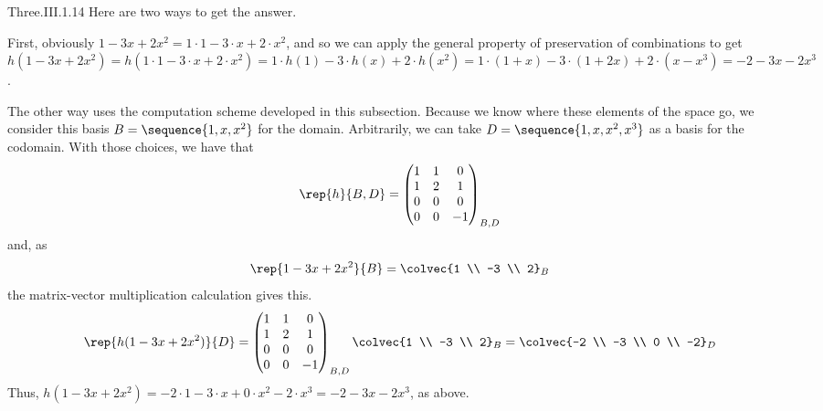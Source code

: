 \begin{ans}{Three.III.1.14}
      Here are two ways to get the answer.

      First, obviously $1-3x+2x^2=1\cdot 1-3\cdot x+2\cdot x^2$, and so we can
      apply the general property of preservation of combinations to get
      $h(1-3x+2x^2)
       =h(1\cdot 1-3\cdot x+2\cdot x^2)
       =1\cdot h(1)-3\cdot h(x)+2\cdot h(x^2)
       =1\cdot (1+x)-3\cdot (1+2x)+2\cdot (x-x^3)
       =-2-3x-2x^3$.

      The other way uses the computation scheme developed in this subsection.
      Because we know where these elements of the space go, we consider
      this basis \( B=\sequence{1,x,x^2} \) for the domain.
      Arbitrarily, we can take \( D=\sequence{1,x,x^2,x^3} \)
      as a basis for the codomain.
      With those choices, we have that
      \begin{equation*}
        \rep{h}{B,D}
        =\begin{pmatrix}
           1   &1  &0  \\
           1   &2  &1  \\
           0   &0  &0  \\
           0   &0  &-1
         \end{pmatrix}_{B,D}
      \end{equation*}
      and, as
      \begin{equation*}
        \rep{1-3x+2x^2}{B}=\colvec{1 \\ -3 \\ 2}_B
      \end{equation*}
      the matrix-vector multiplication calculation gives this.
      \begin{equation*}
        \rep{h(1-3x+2x^2)}{D}=
         \begin{pmatrix}
           1   &1  &0  \\
           1   &2  &1  \\
           0   &0  &0  \\
           0   &0  &-1
         \end{pmatrix}_{B,D}
         \colvec{1 \\ -3 \\ 2}_B
         =\colvec{-2 \\ -3 \\ 0 \\ -2}_D
      \end{equation*}
      Thus, \( h(1-3x+2x^2)
              =-2\cdot 1-3\cdot x+0\cdot x^2-2\cdot x^3
              =-2-3x-2x^3 \),
      as above.
    
\end{ans}
